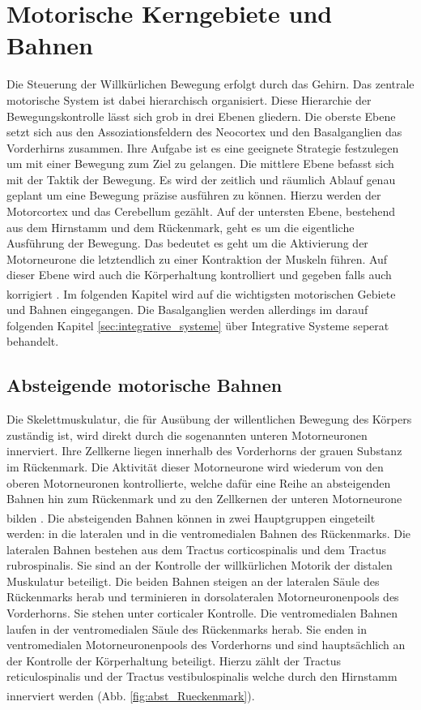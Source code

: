 \documentclass[12pt,a4paper,pdftex]{article}
\begin{document}
\newpage
\section{Motorische Kerngebiete und Bahnen} 
Die Steuerung der Willkürlichen Bewegung erfolgt durch das Gehirn. Das zentrale motorische System ist dabei hierarchisch organisiert. Diese Hierarchie der Bewegungskontrolle lässt sich grob in drei Ebenen gliedern. Die oberste Ebene setzt sich aus den Assoziationsfeldern des Neocortex und den Basalganglien das Vorderhirns zusammen. Ihre Aufgabe ist es eine geeignete Strategie festzulegen um mit einer Bewegung zum Ziel zu gelangen. Die mittlere Ebene befasst sich mit der Taktik der Bewegung. Es wird der zeitlich und räumlich Ablauf genau geplant um eine Bewegung präzise ausführen zu können. Hierzu werden der Motorcortex und das Cerebellum gezählt. Auf der untersten Ebene, bestehend aus dem Hirnstamm und dem Rückenmark, geht es um die eigentliche Ausführung der Bewegung. Das bedeutet es geht um die Aktivierung der Motorneurone die letztendlich zu einer Kontraktion der Muskeln führen. Auf dieser Ebene wird auch die Körperhaltung kontrolliert und gegeben falls auch korrigiert \textsuperscript{\cite[14]{neurowissenschaften_baer}}. Im folgenden Kapitel wird auf die wichtigsten motorischen Gebiete und Bahnen eingegangen. Die Basalganglien werden allerdings im darauf folgenden Kapitel \ref{sec:integrative_systeme} über Integrative Systeme seperat behandelt.       

\subsection{Absteigende motorische Bahnen}
Die Skelettmuskulatur, die für Ausübung der willentlichen Bewegung des Körpers zuständig ist, wird direkt durch die sogenannten unteren Motorneuronen innerviert. Ihre Zellkerne liegen innerhalb des Vorderhorns der grauen Substanz im Rückenmark. Die Aktivität dieser Motorneurone wird wiederum von den oberen Motorneuronen kontrollierte, welche dafür eine Reihe an absteigenden Bahnen hin zum Rückenmark und zu den Zellkernen der unteren Motorneurone bilden \textsuperscript{\cite[1]{crossman2014neuroanatomy}}. Die absteigenden Bahnen können in zwei Hauptgruppen eingeteilt werden: in die lateralen und in die ventromedialen Bahnen des Rückenmarks. Die lateralen Bahnen bestehen aus dem Tractus corticospinalis und dem Tractus rubrospinalis. Sie sind an der Kontrolle der willkürlichen Motorik der distalen Muskulatur beteiligt. Die beiden Bahnen steigen an der lateralen Säule des Rückenmarks herab und terminieren in dorsolateralen Motorneuronenpools des Vorderhorns. Sie stehen unter corticaler Kontrolle. Die ventromedialen Bahnen laufen in der ventromedialen Säule des Rückenmarks herab. Sie enden in ventromedialen Motorneuronenpools des Vorderhorns und sind hauptsächlich an der Kontrolle der Körperhaltung beteiligt. Hierzu zählt der Tractus reticulospinalis und der Tractus vestibulospinalis welche durch den Hirnstamm innerviert werden \textsuperscript{\cite[14]{neurowissenschaften_baer}} (Abb. \ref{fig:abst_Rueckenmark}). 
\end{document}
